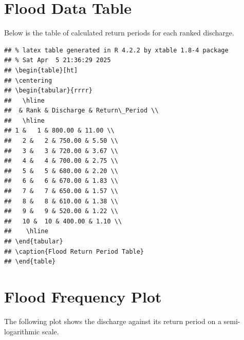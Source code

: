 \documentclass{tufte-handout}\usepackage[]{graphicx}\usepackage[]{xcolor}
\makeatletter
\newenvironment{kframe}{%
 \def\at@end@of@kframe{}%
 \ifinner\ifhmode%
  \def\at@end@of@kframe{\end{minipage}}%
  \begin{minipage}{\columnwidth}%
 \fi\fi%
 \def\FrameCommand##1{\hskip\@totalleftmargin \hskip-\fboxsep
 \colorbox{shadecolor}{##1}\hskip-\fboxsep
     \hskip-\linewidth \hskip-\@totalleftmargin \hskip\columnwidth}%
 \MakeFramed {\advance\hsize-\width
   \@totalleftmargin\z@ \linewidth\hsize
   \@setminipage}}%
 {\par\unskip\endMakeFramed%
 \at@end@of@kframe}
\newenvironment{knitrout}{}{} %
\makeatother
\begin{document}
\section{Flood Data Table}

Below is the table of calculated return periods for each ranked discharge.

\begin{knitrout}
\color{fgcolor}\begin{kframe}
\begin{verbatim}
## % latex table generated in R 4.2.2 by xtable 1.8-4 package
## % Sat Apr  5 21:36:29 2025
## \begin{table}[ht]
## \centering
## \begin{tabular}{rrrr}
##   \hline
##  & Rank & Discharge & Return\_Period \\ 
##   \hline
## 1 &   1 & 800.00 & 11.00 \\ 
##   2 &   2 & 750.00 & 5.50 \\ 
##   3 &   3 & 720.00 & 3.67 \\ 
##   4 &   4 & 700.00 & 2.75 \\ 
##   5 &   5 & 680.00 & 2.20 \\ 
##   6 &   6 & 670.00 & 1.83 \\ 
##   7 &   7 & 650.00 & 1.57 \\ 
##   8 &   8 & 610.00 & 1.38 \\ 
##   9 &   9 & 520.00 & 1.22 \\ 
##   10 &  10 & 400.00 & 1.10 \\ 
##    \hline
## \end{tabular}
## \caption{Flood Return Period Table} 
## \end{table}
\end{verbatim}
\end{kframe}
\end{knitrout}

\section*{Flood Frequency Plot}

The following plot shows the discharge against its return period on a semi-logarithmic scale.
\end{document}
